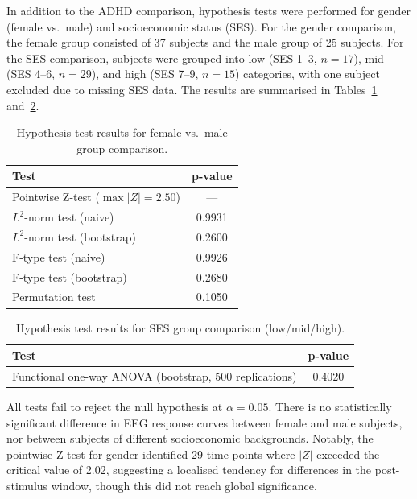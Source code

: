 \documentclass[twoside,11pt]{article}
\begin{document}
In addition to the ADHD comparison, hypothesis tests were performed for gender (female vs.\ male)
and socioeconomic status (SES). For the gender comparison, the female group consisted of 37 subjects
and the male group of 25 subjects. For the SES comparison, subjects were grouped into low (SES 1--3,
$n=17$), mid (SES 4--6, $n=29$), and high (SES 7--9, $n=15$) categories, with one subject excluded
due to missing SES data. The results are summarised in Tables~\ref{tab:gender_tests}
and~\ref{tab:ses_test}.

\begin{table}[ht]
  \centering
  \begin{tabular}{lc}
    \toprule
    \textbf{Test} & \textbf{p-value} \\
    \midrule
    Pointwise Z-test ($\max |Z| = 2.50$) & --- \\
    $L^2$-norm test (naive)              & 0.9931 \\
    $L^2$-norm test (bootstrap)          & 0.2600 \\
    F-type test (naive)                  & 0.9926 \\
    F-type test (bootstrap)              & 0.2680 \\
    Permutation test                     & 0.1050 \\
    \bottomrule
  \end{tabular}
  \caption{Hypothesis test results for female vs.\ male group comparison.}
  \label{tab:gender_tests}
\end{table}

\begin{table}[ht]
  \centering
  \begin{tabular}{lc}
    \toprule
    \textbf{Test} & \textbf{p-value} \\
    \midrule
    Functional one-way ANOVA (bootstrap, 500 replications) & 0.4020 \\
    \bottomrule
  \end{tabular}
  \caption{Hypothesis test results for SES group comparison (low/mid/high).}
  \label{tab:ses_test}
\end{table}

All tests fail to reject the null hypothesis at $\alpha = 0.05$. There is no statistically
significant difference in EEG response curves between female and male subjects, nor between subjects
of different socioeconomic backgrounds. Notably, the pointwise Z-test for gender identified 29 time
points where $|Z|$ exceeded the critical value of 2.02, suggesting a localised tendency for
differences in the post-stimulus window, though this did not reach global significance.
\end{document}
